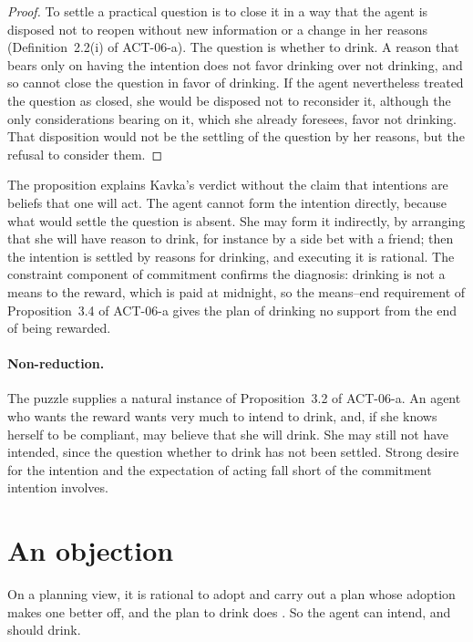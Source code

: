 \documentclass{situationist-preprint}
\begin{document}
\begin{proof}
To settle a practical question is to close it in a way that the agent is disposed not to reopen without new information or a change in her reasons (Definition~2.2(i) of ACT-06-a). The question is whether to drink. A reason that bears only on having the intention does not favor drinking over not drinking, and so cannot close the question in favor of drinking. If the agent nevertheless treated the question as closed, she would be disposed not to reconsider it, although the only considerations bearing on it, which she already foresees, favor not drinking. That disposition would not be the settling of the question by her reasons, but the refusal to consider them.
\end{proof}

The proposition explains Kavka's verdict without the claim that intentions are beliefs that one will act. The agent cannot form the intention directly, because what would settle the question is absent. She may form it indirectly, by arranging that she will have reason to drink, for instance by a side bet with a friend; then the intention is settled by reasons for drinking, and executing it is rational. The constraint component of commitment confirms the diagnosis: drinking is not a means to the reward, which is paid at midnight, so the means--end requirement of Proposition~3.4 of ACT-06-a gives the plan of drinking no support from the end of being rewarded.

\paragraph{Non-reduction.} The puzzle supplies a natural instance of Proposition~3.2 of ACT-06-a. An agent who wants the reward wants very much to intend to drink, and, if she knows herself to be compliant, may believe that she will drink. She may still not have intended, since the question whether to drink has not been settled. Strong desire for the intention and the expectation of acting fall short of the commitment intention involves.

\section{An objection}

\begin{objection}
On a planning view, it is rational to adopt and carry out a plan whose adoption makes one better off, and the plan to drink does \citep{Gauthier1994}. So the agent can intend, and should drink.
\end{objection}
\end{document}
